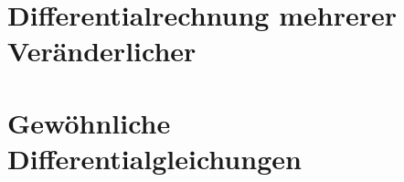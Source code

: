 \documentclass[]{article}
\begin{document}
\pagebreak

\section{Differentialrechnung mehrerer Veränderlicher}

\pagebreak

\section{Gewöhnliche Differentialgleichungen}
\end{document}
